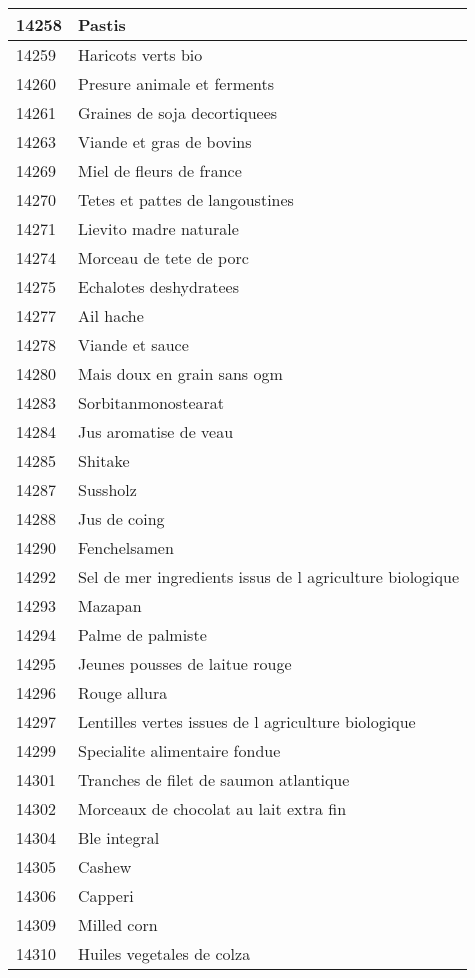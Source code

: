 \begin{longtable}{|l|l|}
14258 & Pastis \\ \hline 
14259 & Haricots verts bio \\ \hline 
14260 & Presure animale et ferments \\ \hline 
14261 & Graines de soja decortiquees \\ \hline 
14263 & Viande et gras de bovins \\ \hline 
14269 & Miel de fleurs de france \\ \hline 
14270 & Tetes et pattes de langoustines \\ \hline 
14271 & Lievito madre naturale \\ \hline 
14274 & Morceau de tete de porc \\ \hline 
14275 & Echalotes deshydratees \\ \hline 
14277 & Ail hache \\ \hline 
14278 & Viande et sauce \\ \hline 
14280 & Mais doux en grain sans ogm \\ \hline 
14283 & Sorbitanmonostearat \\ \hline 
14284 & Jus aromatise de veau \\ \hline 
14285 & Shitake \\ \hline 
14287 & Sussholz \\ \hline 
14288 & Jus de coing \\ \hline 
14290 & Fenchelsamen \\ \hline 
14292 & Sel de mer  ingredients issus de l agriculture biologique \\ \hline 
14293 & Mazapan \\ \hline 
14294 & Palme de palmiste \\ \hline 
14295 & Jeunes pousses de laitue rouge \\ \hline 
14296 & Rouge allura \\ \hline 
14297 & Lentilles vertes issues de l agriculture biologique \\ \hline 
14299 & Specialite alimentaire fondue \\ \hline 
14301 & Tranches de filet de saumon atlantique \\ \hline 
14302 & Morceaux de chocolat au lait extra fin \\ \hline 
14304 & Ble integral \\ \hline 
14305 & Cashew \\ \hline 
14306 & Capperi \\ \hline 
14309 & Milled corn \\ \hline 
14310 & Huiles vegetales de colza \\ \hline 

\end{longtable}
